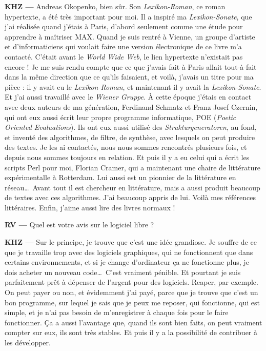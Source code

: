 \documentclass[a4paper,12pt]{article}
\begin{document}
\textbf{KHZ ---} Andreas Okopenko, bien sûr. Son \emph{Lexikon-Roman}, ce roman hypertexte, a été très important pour moi. Il a inspiré ma \emph{Lexikon-Sonate}, que j'ai réalisée quand j'étais à Paris, d'abord seulement comme une étude pour apprendre à maîtriser MAX. Quand je suis rentré à Vienne, un groupe d'artiste et d'informaticiens qui voulait faire une version électronique de ce livre m'a contacté. C'était avant le \emph{World Wide Web}, le lien hypertexte n'existait pas encore ! Je me suis rendu compte que ce que j'avais fait à Paris allait tout-à-fait dans la même direction que ce qu'ils faisaient, et voilà, j'avais un titre pour ma pièce : il y avait eu le \emph{Lexikon-Roman}, et maintenant il y avait la \emph{Lexikon-Sonate}. Et j'ai aussi travaillé avec le \emph{Wiener Gruppe}. À cette époque j'étais en contact avec deux auteurs de ma génération, Ferdinand Schmatz et Franz Josef Czernin, qui ont eux aussi écrit leur propre programme informatique, POE (\emph{Poetic Oriented Evaluations}). Ils ont eux aussi utilisé des \emph{Strukturgeneratoren}, au fond, et inventé des algorithmes, de filtre, de synthèse, avec lesquels on peut produire des textes. Je les ai contactés, nous nous sommes rencontrés plusieurs fois, et depuis nous sommes toujours en relation. Et puis il y a eu celui qui a écrit les scripts Perl pour moi, Florian Cramer, qui a maintenant une chaire de littérature expérimentalle à Rotterdam. Lui aussi est un pionnier de la littérature en réseau\dots~Avant tout il est chercheur en littérature, mais a aussi produit beaucoup de textes avec ces algorithmes. J'ai beaucoup appris de lui. Voilà mes références littéraires. Enfin, j'aime aussi lire des livres normaux !

\textbf{RV ---} Quel est votre avis sur le logiciel libre ?

\textbf{KHZ ---} Sur le principe, je trouve que c'est une idée grandiose. Je souffre de ce que je travaille trop avec des logiciels graphiques, qui ne fonctionnent que dans certains environnements, et si je change d'ordinateur ça ne fonctionne plus, je dois acheter un nouveau code\dots~C'est vraiment pénible. Et pourtant je suis parfaitement prêt à dépenser de l'argent pour des logiciels. Reaper, par exemple. On peut payer ou non, et évidemment j'ai payé, parce que je trouve que c'est un bon programme, sur lequel je sais que je peux me reposer, qui fonctionne, qui est simple, et je n'ai pas besoin de m'enregistrer à chaque fois pour le faire fonctionner. Ça a aussi l'avantage que, quand ils sont bien faits, on peut vraiment compter sur eux, ils sont très stables. Et puis il y a la possibilité de contribuer à les développer.
\end{document}
